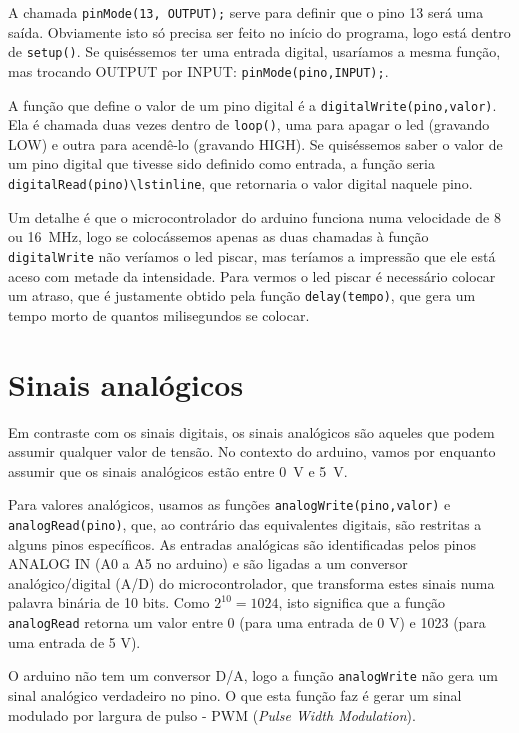 A chamada \lstinline|pinMode(13, OUTPUT);| serve para definir que o pino 13 será uma saída. Obviamente isto só precisa ser feito no início do programa, logo está dentro de \lstinline|setup()|. Se quiséssemos ter uma entrada digital, usaríamos a mesma função, mas trocando OUTPUT por INPUT: \lstinline|pinMode(pino,INPUT);|.

A função que define o valor de um pino digital é a \lstinline|digitalWrite(pino,valor)|. Ela é chamada duas vezes dentro de \lstinline|loop()|, uma para apagar o led (gravando LOW) e outra para acendê-lo (gravando HIGH). Se quiséssemos saber o valor de um pino digital que tivesse sido definido como entrada, a função seria \lstinline|digitalRead(pino)\lstinline|, que retornaria o valor digital naquele pino.

Um detalhe é que o microcontrolador do arduino funciona numa velocidade de 8 ou \SI{16}{MHz}, logo se colocássemos apenas as duas chamadas à função \lstinline|digitalWrite| não veríamos o led piscar, mas teríamos a impressão que ele está aceso com metade da intensidade. Para vermos o led piscar é necessário colocar um atraso, que é justamente obtido pela função \lstinline|delay(tempo)|, que gera um tempo morto de quantos milisegundos se colocar.

\section{Sinais analógicos}
Em contraste com os sinais digitais, os sinais analógicos são aqueles que podem assumir qualquer valor de tensão. No contexto do arduino, vamos por enquanto assumir que os sinais analógicos estão entre \SI{0}{V} e \SI{5}{V}.

Para valores analógicos, usamos as funções \lstinline|analogWrite(pino,valor)| e \lstinline|analogRead(pino)|, que, ao contrário das equivalentes digitais, são restritas a alguns pinos específicos. As entradas analógicas são identificadas pelos pinos ANALOG IN (A0 a A5 no arduino) e são ligadas a um conversor analógico/digital (A/D) do microcontrolador, que transforma estes sinais numa palavra binária de 10 bits. Como $2^{10} = 1024$, isto significa que a função \lstinline|analogRead| retorna um valor entre 0 (para uma entrada de 0 V) e 1023 (para uma entrada de 5 V).

O arduino não tem um conversor D/A, logo a função \lstinline|analogWrite| não gera um sinal analógico verdadeiro no pino. O que esta função faz é gerar um sinal modulado por largura de pulso - PWM (\emph{Pulse Width Modulation}).

